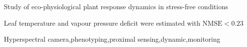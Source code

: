 \documentclass[10pt,authoryear,a4paper]{elsarticle}
\begin{document}
\begin{frontmatter}
\begin{highlights}
    \item Study of eco-physiological plant response dynamics in stress-free conditions
    \item Leaf temperature and vapour pressure deficit were estimated with $\text{NMSE} < 0.23$
\end{highlights}

\begin{keyword}
Hyperspectral camera\sep phenotyping\sep proximal sensing\sep dynamic\sep monitoring 
\end{keyword}

\end{frontmatter}
\end{document}
